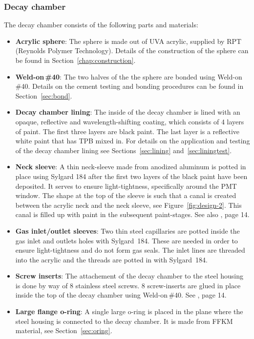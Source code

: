 \subsubsection{Decay chamber}
The decay chamber consists of the following parts and materials:
\begin{itemize}
    \item {\bf Acrylic sphere}: The sphere is made out of UVA acrylic, supplied by RPT (Reynolds Polymer Technology). Details of the construction of the sphere can be found in Section~\ref{chap:construction}.   
    \item {\bf Weld-on\,\#40}: The two halves of the the sphere are bonded using Weld-on\,\#40. Details on the cement testing and bonding procedures can be found in Section~\ref{sec:bond}.
    \item {\bf Decay chamber lining}: The inside of the decay chamber is lined with an opaque, reflective and wavelength-shifting coating, which consists of 4 layers of paint. The first three layers are black paint. The last layer is a reflective white paint that has TPB mixed in. For details on the application and testing of the decay chamber lining see Sections~\ref{sec:lining} and~\ref{sec:liningtest}.
    \item {\bf Neck sleeve}: A thin neck-sleeve made from anodized aluminum is potted in place using Sylgard 184 after the first two layers of the black paint have been deposited. It serves to ensure light-tightness, specifically around the PMT window. The shape at the top of the sleeve is such that a canal is created between the acrylic neck and the neck sleeve, see Figure~\ref{fig:design-2}. This canal is filled up with paint in the subsequent paint-stages. See also \cite{wallig:2015}, page 14.
    \item {\bf Gas inlet/outlet sleeves}: Two thin steel capillaries are potted inside the gas inlet and outlets holes with Sylgard~184. These are needed in order to ensure light-tightness and do not form gas seals. The inlet lines are threaded into the acrylic and the threads are potted in with Sylgard~184. 
    \item {\bf Screw inserts}: The attachement of the decay chamber to the steel housing is done by way of 8 stainless steel screws. 8 screw-inserts are glued in place inside the top of the decay chamber using Weld-on\,\#40. See \cite{wallig:2015}, page 14.
    \item {\bf Large flange o-ring}: A single large o-ring is placed in the plane where the steel housing is connected to the decay chamber. It is made from FFKM material, see Section~\ref{sec:oring}.
\end{itemize}
